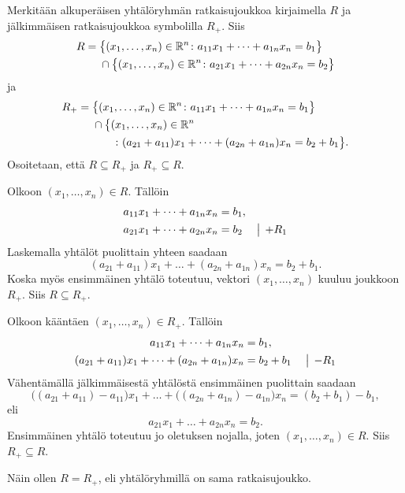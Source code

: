 \documentclass[11pt,a4paper]{amsart}
\begin{document}
\begin{solution}
Merkitään alkuperäisen yhtälöryhmän ratkaisujoukkoa kirjaimella \(R\)
ja jälkimmäisen ratkaisujoukkoa symbolilla \(R_+\). Siis
\[
\begin{aligned}
  R ={}& \bigl\{(x_1,\ldots,x_n)\in\mathbb{R}^n
  \colon a_{11}x_1+\dots+a_{1n}x_n=b_1\bigr\} \\
  &\cap \bigl\{(x_1,\ldots,x_n)\in\mathbb{R}^n
  \colon a_{21}x_1+\dots+a_{2n}x_n=b_2\bigr\}
\end{aligned}
\]
ja
\[
\begin{aligned}
  R_+ ={}& \bigl\{(x_1,\ldots,x_n)\in\mathbb{R}^n
  \colon a_{11}x_1+\dots+a_{1n}x_n=b_1\bigr\} \\
  &\cap \bigl\{(x_1,\ldots,x_n)\in\mathbb{R}^n \\
    &\qquad\colon (a_{21}+a_{11})x_1+\dots+
  (a_{2n}+a_{1n})x_n=b_2+b_1\bigr\}.
\end{aligned}
\]
Osoitetaan, että \(R\subseteq R_+\) ja \(R_+\subseteq R\).

Olkoon \((x_1,\ldots,x_n)\in R\). Tällöin
\[
\begin{aligned}
  a_{11}x_1+\dots+a_{1n}x_n &= b_1, \\
  a_{21}x_1+\dots+a_{2n}x_n &= b_2 \quad\mathrel{\big|}\,+R_1
\end{aligned}
\]
Laskemalla yhtälöt puolittain yhteen saadaan
\[
(a_{21}+a_{11})x_1+\dots+(a_{2n}+a_{1n})x_n=b_2+b_1.
\]
Koska myös ensimmäinen yhtälö toteutuu, vektori
\((x_1,\ldots,x_n)\) kuuluu joukkoon \(R_+\). Siis \(R\subseteq R_+\).

Olkoon kääntäen \((x_1,\ldots,x_n)\in R_+\). Tällöin
\[
\begin{aligned}
  a_{11}x_1+\dots+a_{1n}x_n &= b_1, \\
  (a_{21}+a_{11})x_1+\dots+(a_{2n}+a_{1n})x_n &= b_2+b_1 \quad\mathrel{\big|}\,-R_1
\end{aligned}
\]
Vähentämällä jälkimmäisestä yhtälöstä ensimmäinen puolittain saadaan
\[
\bigl((a_{21}+a_{11})-a_{11}\bigr)x_1+\dots+
\bigl((a_{2n}+a_{1n})-a_{1n}\bigr)x_n=(b_2+b_1)-b_1,
\]
eli
\[
a_{21}x_1+\dots+a_{2n}x_n=b_2.
\]
Ensimmäinen yhtälö toteutuu jo oletuksen nojalla, joten
\((x_1,\ldots,x_n)\in R\). Siis \(R_+\subseteq R\).

Näin ollen \(R=R_+\), eli yhtälöryhmillä on sama ratkaisujoukko.
\end{solution}
\end{document}
